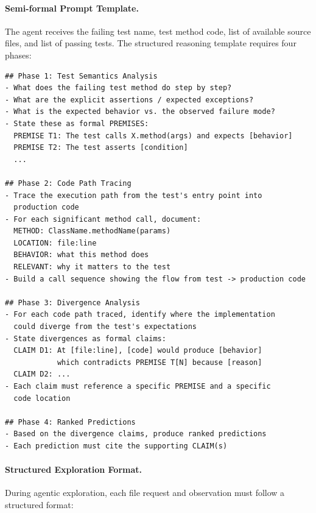 \documentclass[]{meta}
\begin{document}
\paragraph{Semi-formal Prompt Template.}
The agent receives the failing test name, test method code, list of available source files, and list of passing tests. The structured reasoning template requires four phases:

\begin{tcolorbox}[
  title=Semi-formal Fault Localization Template,
  colback=gray!5,
  colframe=gray!75!black,
  fonttitle=\bfseries,
  breakable,
  enhanced
]
\begin{verbatim}
## Phase 1: Test Semantics Analysis
- What does the failing test method do step by step?
- What are the explicit assertions / expected exceptions?
- What is the expected behavior vs. the observed failure mode?
- State these as formal PREMISES:
  PREMISE T1: The test calls X.method(args) and expects [behavior]
  PREMISE T2: The test asserts [condition]
  ...

## Phase 2: Code Path Tracing
- Trace the execution path from the test's entry point into
  production code
- For each significant method call, document:
  METHOD: ClassName.methodName(params)
  LOCATION: file:line
  BEHAVIOR: what this method does
  RELEVANT: why it matters to the test
- Build a call sequence showing the flow from test -> production code

## Phase 3: Divergence Analysis
- For each code path traced, identify where the implementation
  could diverge from the test's expectations
- State divergences as formal claims:
  CLAIM D1: At [file:line], [code] would produce [behavior]
            which contradicts PREMISE T[N] because [reason]
  CLAIM D2: ...
- Each claim must reference a specific PREMISE and a specific
  code location

## Phase 4: Ranked Predictions
- Based on the divergence claims, produce ranked predictions
- Each prediction must cite the supporting CLAIM(s)
\end{verbatim}
\end{tcolorbox}

\paragraph{Structured Exploration Format.}
During agentic exploration, each file request and observation must follow a structured format:
\end{document}
